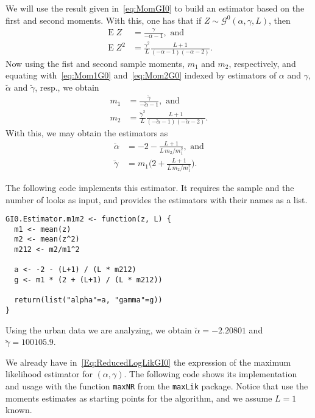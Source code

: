 We will use the result given in~\eqref{eq:MomGI0} to build an estimator based on the first and second moments.
With this, one has that if $Z\sim\mathcal{G}^0(\alpha,\gamma,L)$, then
\begin{align}
\operatorname{E}Z	&= \frac{\gamma}{-\alpha-1}, \text{ and } \label{eq:Mom1G0} \\
\operatorname{E}Z^2	&= \frac{\gamma^2}{L}\frac{L+1}{(-\alpha-1)(-\alpha-2)}. \label{eq:Mom2G0}
\end{align}
Now using the fist and second sample moments, $m_1$ and $m_2$, respectively, and equating with~\eqref{eq:Mom1G0} and~\ref{eq:Mom2G0} indexed by estimators of $\alpha$ and $\gamma$, $\breve{\alpha}$ and $\breve{\gamma}$, resp., we obtain
\begin{align}
m_1	&= \frac{\breve\gamma}{-\breve\alpha-1}, \text{ and } \label{eq:SMom1G0} \\
m_2	&= \frac{\breve\gamma^2}{L}\frac{L+1}{(-\breve\alpha-1)(-\breve\alpha-2)}. \label{eq:SMom2G0}
\end{align}
With this, we may obtain the estimators as
\begin{align}
\breve{\alpha}	& = -2-\frac{L+1}{L\, m_2/m_1^2}, \text{ and} \label{Eq:EstMoma}\\
\breve\gamma		& = m_1 \Big(2+\frac{L+1}{L\, m_2/m_1^2}\Big).\label{Eq:EstMomb}
\end{align}

The following code implements this estimator.
It requires the sample and the number of looks as input,
and provides the estimators with their names as a list.

\begin{lstlisting}[frame=tb]
GI0.Estimator.m1m2 <- function(z, L) {
  m1 <- mean(z)
  m2 <- mean(z^2)
  m212 <- m2/m1^2
    
  a <- -2 - (L+1) / (L * m212)
  g <- m1 * (2 + (L+1) / (L * m212))
  
  return(list("alpha"=a, "gamma"=g))
}
\end{lstlisting}

Using the urban data we are analyzing, we obtain
$\breve{\alpha}=-2.20801$ and $\breve\gamma=100105.9$.

We already have in~\eqref{Eq:ReducedLogLikGI0} the expression of the maximum likelihood estimator for $(\alpha,\gamma)$.
The following code shows its implementation and usage with the function \verb|maxNR| from the \verb|maxLik| package\cite{maxLik}.
Notice that use the moments estimates as starting points for the algorithm, and we assume $L=1$ known.

